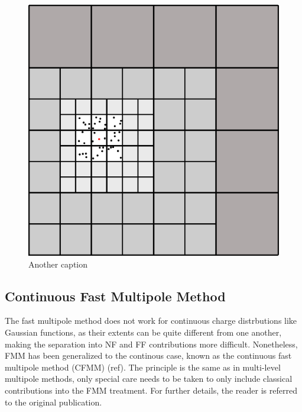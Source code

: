 \begin{figure}
\centering
\includegraphics[scale=0.5]{Pics/FMM2}
\caption{Another caption}
\end{figure}


\subsection{Continuous Fast Multipole Method}

The fast multipole method does not work for continuous charge distrbutions like Gaussian functions, as their extents can be quite different from one another, making the separation into NF and FF contributions more difficult. Nonetheless, FMM has been generalized to the continous case, known as the continuous fast multipole method (CFMM) (ref). The principle is the same as in multi-level multipole methods, only special care needs to be taken to only include classical contributions into the FMM treatment. For further details, the reader is referred to the original publication. 



